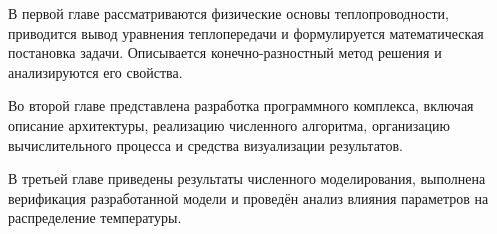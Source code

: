 В первой главе рассматриваются физические основы теплопроводности, приводится вывод уравнения теплопередачи и формулируется математическая постановка задачи. Описывается конечно-разностный метод решения и анализируются его свойства.

Во второй главе представлена разработка программного комплекса, включая описание архитектуры, реализацию численного алгоритма, организацию вычислительного процесса и средства визуализации результатов.

В третьей главе приведены результаты численного моделирования, выполнена верификация разработанной модели и проведён анализ влияния параметров на распределение температуры.

